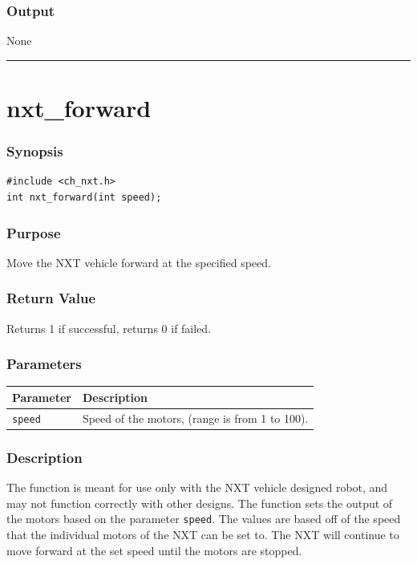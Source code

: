 \documentclass[12pt]{article}
\begin{document}
\subsubsection*{Output}
None 
\\

\hrule
\newpage

\section*{nxt\_forward}

\subsubsection*{Synopsis}
\begin{verbatim}
#include <ch_nxt.h>
int nxt_forward(int speed);
\end{verbatim}

\subsubsection*{Purpose}
Move the NXT vehicle forward at the specified speed.

\subsubsection*{Return Value}
Returns 1 if successful, returns 0 if failed.

\subsubsection*{Parameters}
\begin{tabular}{ l | p{12cm} }
Parameter			& Description\\ \hline
\verb+speed+	    & Speed of the motors, (range is from 1 to 100).
\end{tabular}

\subsubsection*{Description}
The function is meant for use only with the NXT vehicle designed robot, 
and may not function correctly with other designs. The function sets the 
output of the motors based on the parameter \verb+speed+. The values are 
based off of the speed that the individual motors of the NXT can be set to. 
The NXT will continue to move forward at the set speed until the motors are 
stopped.
\end{document}
